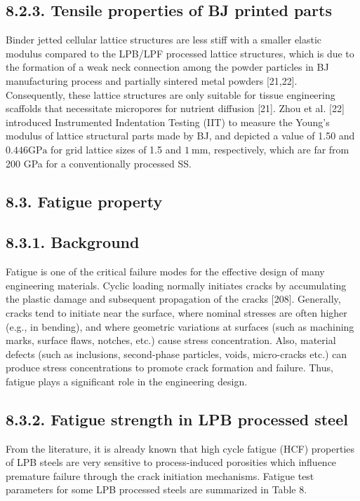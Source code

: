 \documentclass[10pt]{article}
\begin{document}
\subsection*{8.2.3. Tensile properties of BJ printed parts}
Binder jetted cellular lattice structures are less stiff with a smaller elastic modulus compared to the LPB/LPF processed lattice structures, which is due to the formation of a weak neck connection among the powder particles in BJ manufacturing process and partially sintered metal powders [21,22]. Consequently, these lattice structures are only suitable for tissue engineering scaffolds that necessitate micropores for nutrient diffusion [21]. Zhou et al. [22] introduced Instrumented Indentation Testing (IIT) to measure the Young's modulus of lattice structural parts made by BJ, and depicted a value of 1.50 and $0.446 \mathrm{GPa}$ for grid lattice sizes of 1.5 and $1 \mathrm{~mm}$, respectively, which are far from 200 GPa for a conventionally processed SS.

\subsection*{8.3. Fatigue property}
\subsection*{8.3.1. Background}
Fatigue is one of the critical failure modes for the effective design of many engineering materials. Cyclic loading normally initiates cracks by accumulating the plastic damage and subsequent propagation of the cracks [208]. Generally, cracks tend to initiate near the surface, where nominal stresses are often higher (e.g., in bending), and where geometric variations at surfaces (such as machining marks, surface flaws, notches, etc.) cause stress concentration. Also, material defects (such as inclusions, second-phase particles, voids, micro-cracks etc.) can produce stress concentrations to promote crack formation and failure. Thus, fatigue plays a significant role in the engineering design.

\subsection*{8.3.2. Fatigue strength in LPB processed steel}
From the literature, it is already known that high cycle fatigue (HCF) properties of LPB steels are very sensitive to process-induced porosities which influence premature failure through the crack initiation mechanisms. Fatigue test parameters for some LPB processed steels are summarized in Table 8.
\end{document}
